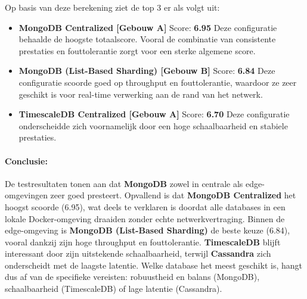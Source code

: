 Op basis van deze berekening ziet de top 3 er als volgt uit:

\begin{itemize}
    \item \textbf{MongoDB Centralized [Gebouw A]} Score: \textbf{6.95}  
    Deze configuratie behaalde de hoogste totaalscore. Vooral de combinatie van consistente prestaties en fouttolerantie zorgt voor een sterke algemene score.

    \item \textbf{MongoDB (List-Based Sharding) [Gebouw B]} Score: \textbf{6.84}  
    Deze configuratie scoorde goed op throughput en fouttolerantie, waardoor ze zeer geschikt is voor real-time verwerking aan de rand van het netwerk.

    \item \textbf{TimescaleDB Centralized [Gebouw A]} Score: \textbf{6.70}  
    Deze configuratie onderscheidde zich voornamelijk door een hoge schaalbaarheid en stabiele prestaties.
\end{itemize}

\paragraph{Conclusie:}
De testresultaten tonen aan dat \textbf{MongoDB} zowel in centrale als edge-omgevingen zeer goed presteert.  
Opvallend is dat \textbf{MongoDB Centralized} het hoogst scoorde (6.95), wat deels te verklaren is doordat alle databases in een lokale Docker-omgeving draaiden zonder echte netwerkvertraging.  
Binnen de edge-omgeving is \textbf{MongoDB (List-Based Sharding)} de beste keuze (6.84), vooral dankzij zijn hoge throughput en fouttolerantie.  
\textbf{TimescaleDB} blijft interessant door zijn uitstekende schaalbaarheid, terwijl \textbf{Cassandra} zich onderscheidt met de laagste latentie.  
Welke database het meest geschikt is, hangt dus af van de specifieke vereisten: robuustheid en balans (MongoDB), schaalbaarheid (TimescaleDB) of lage latentie (Cassandra).